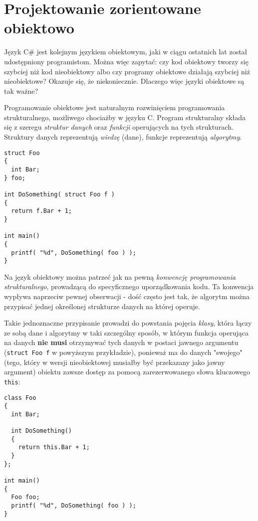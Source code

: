 ﻿\section{Projektowanie zorientowane obiektowo}

Język C\# jest kolejnym językiem obiektowym, jaki w ciągu ostatnich lat został udostępniony programistom.
Można więc zapytać: czy kod obiektowy tworzy się szybciej niż kod nieobiektowy albo czy 
programy obiektowe działają szybciej niż nieobiektowe? Okazuje się, że niekoniecznie. Dlaczego więc
języki obiektowe są tak ważne? 

Programowanie obiektowe jest naturalnym rozwinięciem programowania strukturalnego, możliwego chociażby 
w języku C. Program strukturalny składa się z szeregu {\em struktur danych} oraz {\em funkcji} operujących na 
tych strukturach. Struktury danych reprezentują {\em wiedzę} (dane), funkcje reprezentują {\em algorytmy}.

\begin{scriptsize}
\begin{verbatim}
struct Foo
{
  int Bar;
} foo;

int DoSomething( struct Foo f ) 
{
  return f.Bar + 1;
}

int main()
{
  printf( "%d", DoSomething( foo ) );
}
\end{verbatim}
\end{scriptsize}

Na język obiektowy można patrzeć jak na pewną {\em konwencję programowania strukturalnego}, prowadzącą do specyficznego 
uporządkowania kodu. Ta konwencja wypływa naprzeciw pewnej obserwacji - dość często jest tak, że algorytm można
przypisać jednej określonej strukturze danych na której operuje. 

Takie jednoznaczne przypisanie prowadzi do powstania pojęcia {\em klasy}, która łączy ze sobą dane i algorytmy w taki
szczególny sposób, w którym funkcja operująca na danych {\bf nie musi} otrzymywać tych danych w postaci jawnego argumentu
({\tt struct Foo f} w powyższym przykładzie), ponieważ ma do danych "swojego" (tego, który w wersji nieobiektowej
musiałby być przekazany jako jawny argument) obiektu zawsze dostęp za pomocą
zarezerwowanego słowa kluczowego {\tt this}:

\begin{scriptsize}
\begin{verbatim}
class Foo
{
  int Bar;

  int DoSomething() 
  {
    return this.Bar + 1;
  }
};

int main()
{
  Foo foo; 
  printf( "%d", DoSomething( foo ) );
}
\end{verbatim}
\end{scriptsize}

